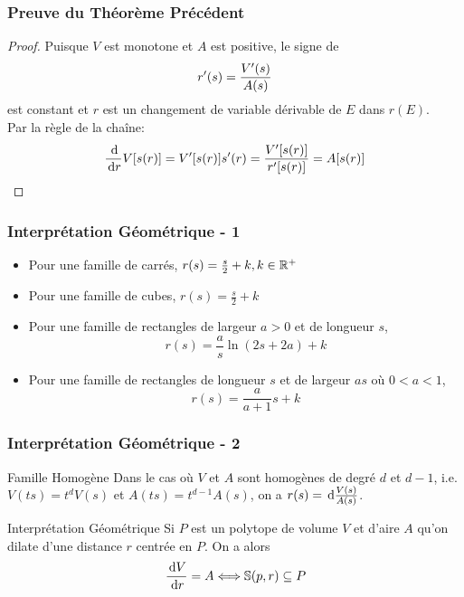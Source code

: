 \documentclass{../beamercours}
\begin{document}
\begin{frame}
    \frametitle{Preuve du Théorème Précédent}
    \begin{proof}
        Puisque $V$ est monotone et $A$ est positive, le signe de \vspace{-5pt}
        \begin{equation*}
            r'(s) = \frac{V'(s)}{A(s)}\vspace{-5pt}
        \end{equation*}
        est constant et $r$ est un changement de variable dérivable de $E$ dans $r(E)$.\\
        Par la règle de la chaîne: 
        \vspace{-5pt}
        \begin{equation*}
            \frac{\d}{\d r}V[s(r)] = V'[s(r)]s'(r) = \frac{V'[s(r)]}{r'[s(r)]} = A[s(r)]\vspace{-5pt}
        \end{equation*}
    \end{proof}
\end{frame}

\begin{frame}
    \frametitle{Interprétation Géométrique - 1}
    \begin{itemize}[<+->]
        \item Pour une famille de carrés, $r(s) = \frac{s}{2} + k,  k \in \mathbb{R}^{+}$
        \item Pour une famille de cubes, $r(s) = \frac{s}{2} + k$
        \item Pour une famille de rectangles de largeur $a > 0$ et de longueur $s$, \[r(s) = \frac{a}{s}\ln(2s + 2a) + k\]
        \item Pour une famille de rectangles de longueur $s$ et de largeur $as$ où $0 < a < 1$, \[r(s) = \frac{a}{a + 1}s + k\]
    \end{itemize}
\end{frame}

\begin{frame}
    \frametitle{Interprétation Géométrique - 2}
    
    \begin{théorème}
        {Famille Homogène}{}
        Dans le cas où $V$ et $A$ sont homogènes de degré $d$ et $d - 1$, i.e. $V(ts) = t^{d}V(s)$ et $A(ts) = t^{d-1}A(s)$, on a $r(s) = {\rm \, d} \frac{V(s)}{A(s)}$.
    \end{théorème}

    \begin{théorème}
        {Interprétation Géométrique}{}
        Si $P$ est un polytope de volume $V$ et d'aire $A$ qu'on dilate d'une distance $r$ centrée en $P$. On a alors \vspace{-5pt}
        \begin{equation*}
            \frac{\d V}{\d r} = A \Longleftrightarrow \mathbb{S}(p, r) \subseteq P\vspace{-3pt}
        \end{equation*}
    \end{théorème}
\end{frame}
\end{document}
